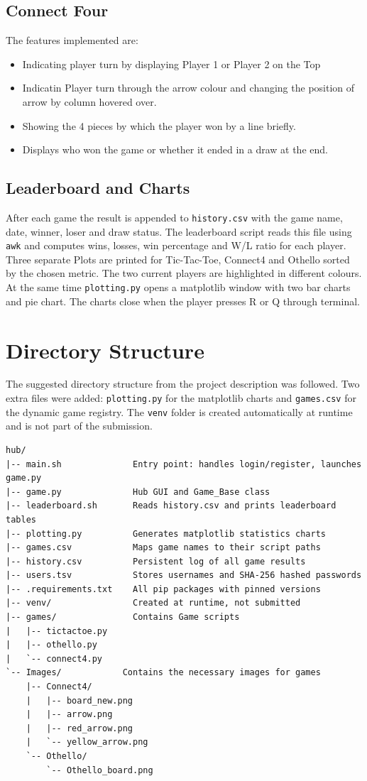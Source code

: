 \documentclass[12pt,a4paper]{article}
\begin{document}
\subsection{Connect Four}
The features implemented are:
\begin{itemize}
    \item Indicating player turn by displaying Player 1 or Player 2 on the Top
    \item Indicatin Player turn through the arrow colour and changing the position of arrow by column hovered over.
    \item Showing the 4 pieces by which the player won by a line briefly.
    \item Displays who won the game or whether it ended in a draw at the end.
\end{itemize}

\subsection{Leaderboard and Charts}
After each game the result is appended to \texttt{history.csv} with the game name, date, winner, loser and draw status. The leaderboard script reads this file using \texttt{awk} and computes wins, losses, win percentage and W/L ratio for each player. Three separate Plots are printed for Tic-Tac-Toe, Connect4 and Othello sorted by the chosen metric. The two current players are highlighted in different colours. At the same time \texttt{plotting.py} opens a matplotlib window with two bar charts and pie chart. The charts close when the player presses R or Q through terminal.


\section{Directory Structure}
\label{sec:directory}

The suggested directory structure from the project description was followed. Two extra files were added: \texttt{plotting.py} for the matplotlib charts and \texttt{games.csv} for the dynamic game registry. The \texttt{venv} folder is created automatically at runtime and is not part of the submission.

\begin{verbatim}
hub/
|-- main.sh              Entry point: handles login/register, launches game.py
|-- game.py              Hub GUI and Game_Base class
|-- leaderboard.sh       Reads history.csv and prints leaderboard tables
|-- plotting.py          Generates matplotlib statistics charts
|-- games.csv            Maps game names to their script paths
|-- history.csv          Persistent log of all game results
|-- users.tsv            Stores usernames and SHA-256 hashed passwords
|-- .requirements.txt    All pip packages with pinned versions
|-- venv/                Created at runtime, not submitted
|-- games/               Contains Game scripts
|   |-- tictactoe.py     
|   |-- othello.py       
|   `-- connect4.py     
`-- Images/            Contains the necessary images for games
    |-- Connect4/
    |   |-- board_new.png
    |   |-- arrow.png
    |   |-- red_arrow.png
    |   `-- yellow_arrow.png
    `-- Othello/
        `-- Othello_board.png
\end{verbatim}
\end{document}
